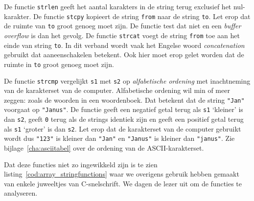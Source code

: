 De functie \texttt{strlen} geeft het aantal karakters in de string terug exclusief het nul-karakter. De functie \texttt{stcpy} kopieert de string \texttt{from} naar de string \texttt{to}. Let erop dat de ruimte van \texttt{to} groot genoeg moet zijn. De functie test dat niet en een \textsl{buffer overflow} is dan het gevolg. De functie \texttt{strcat} voegt de string \texttt{from} toe aan het einde van string \texttt{to}. In dit verband wordt vaak het Engelse woord \textsl{concatenation} gebruikt dat aaneenschakelen betekent. Ook hier moet erop gelet worden dat de ruimte in \texttt{to} groot genoeg moet zijn.

De functie \texttt{strcmp} vergelijkt \texttt{s1} met \texttt{s2} op \textsl{alfabetische ordening} met inachtneming van de karakterset van de computer. Alfabetische ordening wil min of meer zeggen: zoals de woorden in een woordenboek. Dat betekent dat de string \texttt{"Jan"} voorgaat op \texttt{"Janus"}. De functie geeft een negatief getal terug als \texttt{s1} `kleiner' is dan \texttt{s2}, geeft \texttt{0} terug als de strings identiek zijn en geeft een positief getal terug als \texttt{s1} `groter' is dan \texttt{s2}. Let erop dat de karakterset van de computer gebruikt wordt dus \texttt{"123"} is kleiner dan \texttt{"Jan"} en \texttt{"Janus"} is kleiner dan \texttt{"janus"}. Zie bijlage~\ref{cha:asciitabel} over de ordening van de ASCII-karakterset.

Dat deze functies niet zo ingewikkeld zijn is te zien listing~\ref{cod:array_stringfunctions} waar we overigens gebruik hebben gemaakt van enkele juweeltjes van C-snelschrift. We dagen de lezer uit om de functies te analyseren.



